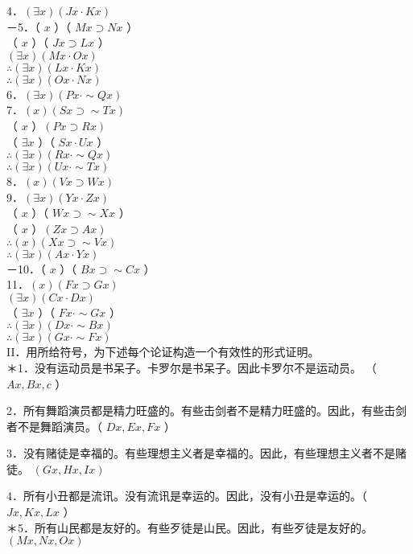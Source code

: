 4．$(\exists x)(J x \cdot K x)$\\
－5．（ $x$ ）（ $M x \supset N x$ ）\\
（ $x$ ）（ $J x \supset L x$ ）\\
$(\exists x)(M x \cdot O x)$\\
$\therefore(\exists x)(L x \cdot K x)$\\
$\therefore(\exists x)(O x \cdot N x)$\\
6．$(\exists x)(P x \cdot \sim Q x)$\\
7．$(x)(S x \supset \sim T x)$\\
（ $x$ ）$(P x \supset R x)$\\
（ $\exists x$ ）（ $S x \cdot U x$ ）\\
$\therefore(\exists x)(R x \cdot \sim Q x)$\\
$\therefore(\exists x)(U x \cdot \sim T x)$\\
8．$(x)(V x \supset W x)$\\
9．$(\exists x)(Y x \cdot Z x)$\\
（ $x$ ）（ $W x \supset \sim X x$ ）\\
（ $x$ ）$(Z x \supset A x)$\\
$\therefore(x)(X x \supset \sim V x)$\\
$\therefore(\exists x)(A x \cdot Y x)$\\
－10．（ $x$ ）（ $B x \supset \sim C x$ ）\\
11．$(x)(F x \supset G x)$\\
$(\exists x)(C x \cdot D x)$\\
（ $\exists x$ ）（ $F x \cdot \sim G x$ ）\\
$\therefore(\exists x)(D x \cdot \sim B x)$\\
$\therefore(\exists x)(G x \cdot \sim F x)$\\
II．用所给符号，为下述每个论证构造一个有效性的形式证明。\\
＊1．没有运动员是书呆子。卡罗尔是书呆子。因此卡罗尔不是运动员。 （ $A x, B x, c$ ）

2．所有舞蹈演员都是精力旺盛的。有些击剑者不是精力旺盛的。因此，有些击剑者不是舞蹈演员。（ $D x, E x, F x$ ）

3．没有赌徒是幸福的。有些理想主义者是幸福的。因此，有些理想主义者不是赌徒。 $(G x, H x, I x)$

4．所有小丑都是流讯。没有流讯是幸运的。因此，没有小丑是幸运的。（ $J x, K x, L x$ ）\\
＊5．所有山民都是友好的。有些歹徒是山民。因此，有些歹徒是友好的。 $(M x, N x, O x)$

